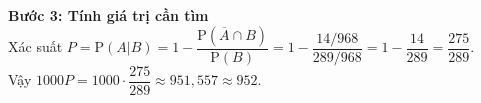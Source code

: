 \begin{ex}
{		\noindent\textbf{Bước 3: Tính giá trị cần tìm}\\
		Xác suất $P = \mathrm{P}(A|B) = 1 - \dfrac{\mathrm{P}(\overline{A} \cap B)}{\mathrm{P}(B)} = 1 - \dfrac{14/968}{289/968} = 1 - \dfrac{14}{289} = \dfrac{275}{289}$.\\
		Vậy $1000P = 1000 \cdot \dfrac{275}{289} \approx 951{,}557 \approx 952$.
	}
\end{ex}
\newpage
{}
\label{B\thedeso}
